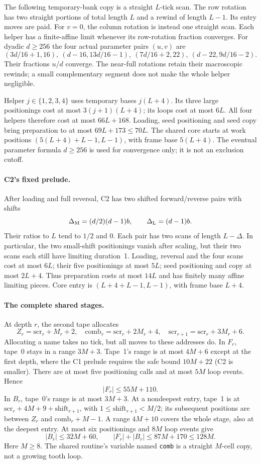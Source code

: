 The following temporary-bank copy is a straight $L$-tick scan. The row
rotation has two straight portions of total length $L$ and a rewind of
length $L-1$. Its entry moves are paid. For $v=0$, the column rotation
is instead one straight scan. Each helper has a finite-affine limit
whenever its row-rotation fraction converges.
For dyadic $d\ge256$ the four actual parameter pairs $(u,v)$ are
\[
 (3d/16+1,16),\ (d-16,13d/16-1),\
 (7d/16+2,22),\ (d-22,9d/16-2).
\]
Their fractions $u/d$ converge. The near-full rotations retain their
macroscopic rewinds; a small complementary segment does not make the
whole helper negligible.

Helper $j\in\{1,2,3,4\}$ uses temporary bases $j(L+4)$.
Its three large positionings cost at most $3(j+1)(L+4)$; its loops
cost at most $6L$. All four helpers therefore cost at most $66L+168$.
Loading, seed positioning and seed copy bring preparation to at most
$69L+173\le70L$. The shared core starts at work positions
$(5(L+4)+L-1,L-1)$, with frame base $5(L+4)$.
The eventual parameter formula $d\ge256$ is used for convergence only;
it is not an exclusion cutoff.

\paragraph{C2's fixed prelude.}
After loading and full reversal, C2 has two shifted forward/reverse
pairs with shifts
\[
 \Delta_{\rm M}=(d/2)(d-1)b,\qquad \Delta_{\rm L}=(d-1)b.
\]
Their ratios to $L$ tend to $1/2$ and $0$. Each pair has two scans of
length $L-\Delta$. In particular, the two small-shift positionings vanish
after scaling, but their two scans each still have limiting duration~1.
Loading, reversal and the four scans cost at most $6L$; their five
positionings at most $5L$; seed positioning and copy at most $2L+4$.
Thus preparation costs at most $14L$ and has finitely many affine
limiting pieces. Core entry is $(L+4+L-1,L-1)$, with frame base $L+4$.

\paragraph{The complete shared stages.}
At depth $r$, the second tape allocates
\[
 Z_r=\mathrm{scr}_r+M_r+2,\quad
 \mathrm{comb}_r=\mathrm{scr}_r+2M_r+4,\quad
 \mathrm{scr}_{r+1}=\mathrm{scr}_r+3M_r+6.
\]
Allocating a name takes no tick, but all moves to these addresses do.
In $F_r$, tape~0 stays in a range $3M+3$. Tape~1's range is at most
$4M+6$ except at the first depth, where the C1 prelude requires the safe
bound $10M+22$ (C2 is smaller). There are at most five positioning calls
and at most $5M$ loop events. Hence
\[
 |F_r|\le55M+110.
\]
In $B_r$, tape~0's range is at most $3M+3$. At a nondeepest entry,
tape~1 is at
$\mathrm{scr}_r+4M+9+\mathrm{shift}_{r+1}$, with
$1\le\mathrm{shift}_{r+1}<M/2$; its subsequent positions are between
$Z_r$ and $\mathrm{comb}_r+M-1$. A range $4M+10$ covers the whole
stage, also at the deepest entry. At most six positionings and $8M$
loop events give
\[
 |B_r|\le32M+60,\qquad |F_r|+|B_r|\le87M+170\le128M.
\]
Here $M\ge8$. The shared routine's variable named \texttt{comb} is a
straight $M$-cell copy, not a growing tooth loop.

